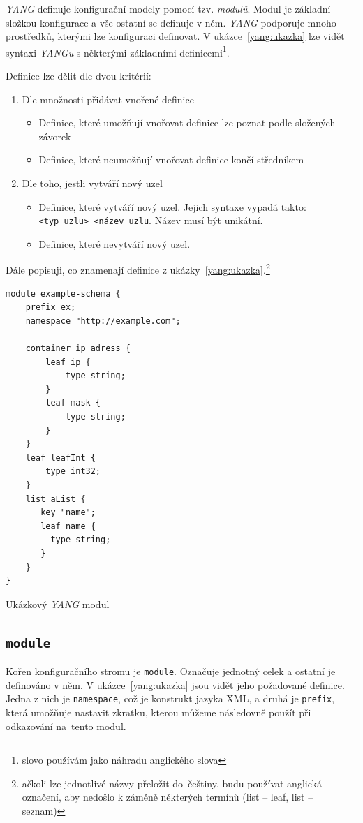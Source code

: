 \documentclass[thesis=B,czech,hidelinks]{FITthesis}[2019/03/06]
\begin{document}
\textit{YANG} definuje konfigurační modely pomocí tzv. \textit{modulů}. Modul je základní složkou konfigurace a vše ostatní se definuje v něm. \textit{YANG} podporuje mnoho prostředků, kterými lze konfiguraci definovat. V ukázce~\ref{yang:ukazka} lze vidět syntaxi \textit{YANGu} s některými základními definicemi\footnote{slovo  používám jako náhradu anglického slova }.

Definice lze dělit dle dvou kritérií:

\begin{enumerate}
    \item Dle množnosti přidávat vnořené definice
        \begin{itemize}
            \item Definice, které umožňují vnořovat definice lze poznat podle složených závorek
            \item Definice, které neumožňují vnořovat definice končí středníkem
        \end{itemize}
    \item Dle toho, jestli vytváří nový uzel
        \begin{itemize}
            \item Definice, které vytváří nový uzel. Jejich syntaxe vypadá takto:
                \texttt{<typ~uzlu>~<název~uzlu}. Název musí být unikátní.
            \item Definice, které nevytváří nový uzel.
        \end{itemize}
\end{enumerate}

Dále popisuji, co znamenají definice z ukázky~\ref{yang:ukazka}.\footnote{ačkoli lze jednotlivé názvy přeložit do~češtiny, budu používat anglická označení, aby nedošlo k záměně některých termínů (list -- leaf, list -- seznam)}

\begin{listing}[H]
\begin{verbatim}
module example-schema {
    prefix ex;
    namespace "http://example.com";

    container ip_adress {
        leaf ip {
            type string;
        }
        leaf mask {
            type string;
        }
    }
    leaf leafInt {
        type int32;
    }
    list aList {
       key "name";
       leaf name {
         type string;
       }
    }
}
\end{verbatim}
\caption{Ukázkový \textit{YANG} modul}\label{yang:ukazka}
\end{listing}
\subsection{\texttt{module}}
Kořen konfiguračního stromu je \texttt{module}. Označuje jednotný celek a ostatní je definováno v něm. V ukázce~\ref{yang:ukazka} jsou vidět jeho požadované definice. Jedna z nich je \texttt{namespace}, což je konstrukt jazyka XML, a druhá je \texttt{prefix}, která umožňuje nastavit zkratku, kterou můžeme následovně použít při odkazování na~tento modul.
\end{document}
